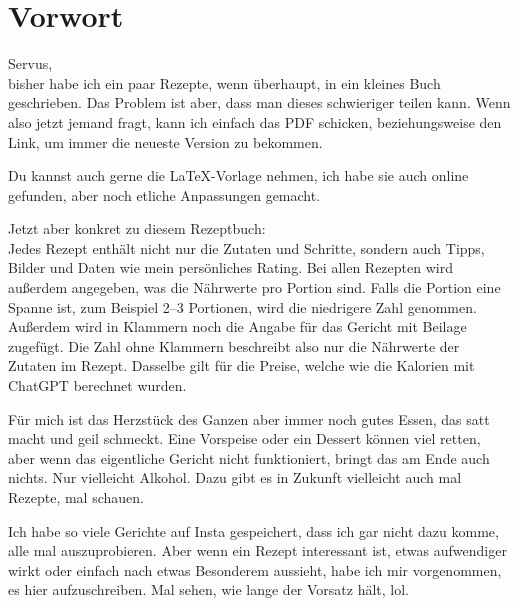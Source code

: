 \documentclass[
a4paper,
11pt
]{article}
\begin{document}


\clearpage

\tableofcontents
\clearpage

\section{Vorwort}

Servus,\\
bisher habe ich ein paar Rezepte, wenn überhaupt, in ein kleines Buch geschrieben. Das Problem ist aber, dass man dieses schwieriger teilen kann. Wenn also jetzt jemand fragt, kann ich einfach das PDF schicken, beziehungsweise den Link, um immer die neueste Version zu bekommen.

Du kannst auch gerne die LaTeX-Vorlage nehmen, ich habe sie auch online gefunden, aber noch etliche Anpassungen gemacht.

Jetzt aber konkret zu diesem Rezeptbuch:\\
Jedes Rezept enthält nicht nur die Zutaten und Schritte, sondern auch Tipps, Bilder und Daten wie mein persönliches Rating. Bei allen Rezepten wird außerdem angegeben, was die Nährwerte pro Portion sind. Falls die Portion eine Spanne ist, zum Beispiel 2--3 Portionen, wird die niedrigere Zahl genommen. Außerdem wird in Klammern noch die Angabe für das Gericht mit Beilage zugefügt. Die Zahl ohne Klammern beschreibt also nur die Nährwerte der Zutaten im Rezept. Dasselbe gilt für die Preise, welche wie die Kalorien mit ChatGPT berechnet wurden.

Für mich ist das Herzstück des Ganzen aber immer noch gutes Essen, das satt macht und geil schmeckt. Eine Vorspeise oder ein Dessert können viel retten, aber wenn das eigentliche Gericht nicht funktioniert, bringt das am Ende auch nichts. Nur vielleicht Alkohol. Dazu gibt es in Zukunft vielleicht auch mal Rezepte, mal schauen.

Ich habe so viele Gerichte auf Insta gespeichert, dass ich gar nicht dazu komme, alle mal auszuprobieren. Aber wenn ein Rezept interessant ist, etwas aufwendiger wirkt oder einfach nach etwas Besonderem aussieht, habe ich mir vorgenommen, es hier aufzuschreiben. Mal sehen, wie lange der Vorsatz hält, lol.
\end{document}

